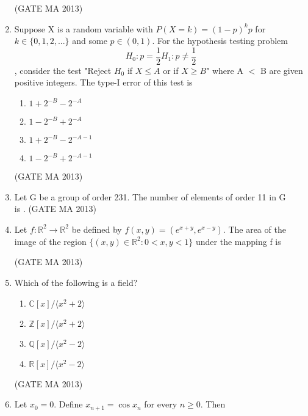 \documentclass[journal,12pt,onecolumn]{IEEEtran}
\theoremstyle{remark}
\begin{document}
\begin{enumerate}
\begin{enumerate}
    \end{enumerate}
    \hfill (GATE MA 2013)
    \item Suppose X is a random variable with $P(X=k) = (1-p)^k p$ for $k \in \{0,1,2,...\}$ and some $p \in (0,1)$. For the hypothesis testing problem $$H_0: p = \frac{1}{2} H_1: p \neq \frac{1}{2}$$, consider the test "Reject $H_0$ if $X \leq A$ or if $X \geq B$" where A $<$ B are given positive integers. The type-I error of this test is
    \begin{enumerate}
        \item $1 + 2^{-B} - 2^{-A}$
        \item $1 - 2^{-B} + 2^{-A}$
        \item $1 + 2^{-B} - 2^{-A-1}$
        \item $1 - 2^{-B} + 2^{-A-1}$
    \end{enumerate}
    \hfill (GATE MA 2013)
    \item Let G be a group of order 231. The number of elements of order 11 in G \\ is \underline{\hspace{1cm}}.
    \hfill (GATE MA 2013)
    \item Let $f: \mathbb{R}^2 \rightarrow \mathbb{R}^2$ be defined by $f(x,y) = (e^{x+y}, e^{x-y})$. The area of the image of the region $\{(x,y) \in \mathbb{R}^2 : 0 < x, y < 1\}$ under the mapping f is
    \begin{enumerate}
    \end{enumerate}
     \hfill (GATE MA 2013)
    \item Which of the following is a field?
    \begin{enumerate}
        \item $\mathbb{C}[x] / \langle x^2+2 \rangle$
        \item $\mathbb{Z}[x] / \langle x^2+2 \rangle$
        \item $\mathbb{Q}[x] / \langle x^2-2 \rangle$
        \item $\mathbb{R}[x] / \langle x^2-2 \rangle$
    \end{enumerate}
    \hfill (GATE MA 2013)
    \item Let $x_0 = 0$. Define $x_{n+1} = \cos x_n$ for every $n \ge 0$. Then

\end{enumerate}
\end{document}
